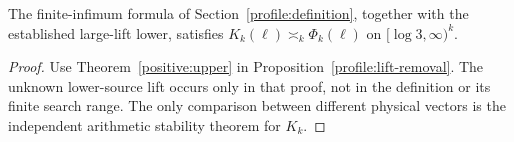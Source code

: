 \begin{corollary}
\label{positive:explicit-profile}
The finite-infimum formula of Section~\ref{profile:definition}, together
with the established large-lift lower, satisfies
$K_k(\ell)\asymp_k\Phi_k(\ell)$ on $[\log3,\infty)^k$.
\end{corollary}
\begin{proof}
Use Theorem~\ref{positive:upper} in
Proposition~\ref{profile:lift-removal}. The unknown lower-source lift
occurs only in that proof, not in the definition or its finite search
range. The only comparison between different physical vectors is the
independent arithmetic stability theorem for $K_k$.
\end{proof}
